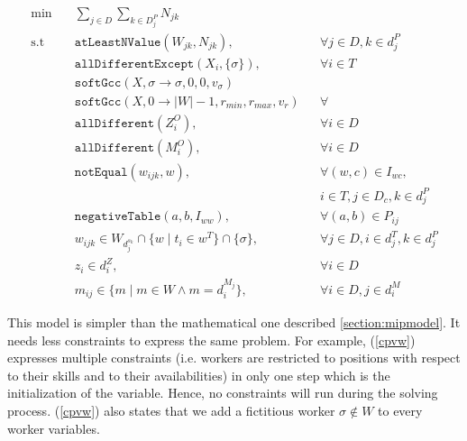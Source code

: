 \documentclass[../../thesis.tex]{subfiles}
\begin{document}
\begin{align}
  \textrm{min} \quad & \sum_{j \in D} \sum_{k \in D^P_j} N_{jk} & \label{cpobj} \\ 
  \textrm{s.t} \quad & \texttt{atLeastNValue}(W_{jk}, N_{jk}), && \forall j \in D, k \in d^P_j \label{cpobjctr} \\
                     & \texttt{allDifferentExcept}(X_i, \{ \sigma \}), && \forall i \in T \label{cpw1} \\
                     & \texttt{softGcc}(X, \sigma \rightarrow \sigma, 0, 0, v_{\sigma}) && \\
                     & \texttt{softGcc}(X, 0 \rightarrow |W| -1, r_{min}, r_{max}, v_{r}) && \forall \\
                     & \texttt{allDifferent}(Z^O_i), && \forall i \in D \label{cpz1} \\
                     & \texttt{allDifferent}(M^O_i), && \forall i \in D \label{cpm1} \\ 
                     & \texttt{notEqual}(w_{ijk}, w), && \forall (w, c) \in I_{wc}, \label{cpw2} \\ 
                     & && i \in T, j \in D_c, k \in d^P_j \nonumber \\ 
                     & \texttt{negativeTable}(a, b, I_{ww}), && \forall (a, b) \in P_{ij} \label{cpw3} \\ 
                     & w_{ijk} \in W_{d^{s_k}_j} \cap \{ w \mid t_i \in w^T \} \cap \{ \sigma \}, && \forall j \in D, i \in d^T_j, k \in d^P_j \label{cpvw} \\ 
                     & z_{i} \in d_i^Z, && \forall i \in D \label{cpvz} \\ 
                     & m_{ij} \in \{ m \mid m \in W \land m = d^{M_j}_i \}, && \forall i \in D, j \in d^M_i \label{cpvm}
\end{align}


This model is simpler than the mathematical one described \autoref{section:mipmodel}. It 
needs less constraints to express the same problem. For example, (\ref{cpvw}) expresses multiple constraints (i.e. workers are restricted to positions with respect to their skills and to their availabilities)
in only one step which is the initialization of the variable. Hence, no constraints will run during the solving process. (\ref{cpvw}) also states that we add a 
fictitious worker $\sigma \notin W$ to every worker variables.
\end{document}
